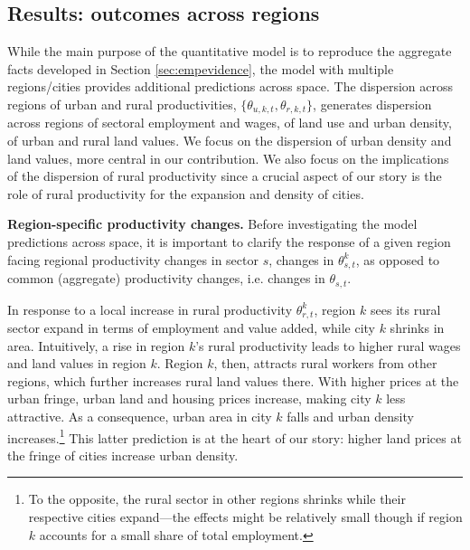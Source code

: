 \documentclass[./20250130-paper.tex]{subfiles}
\begin{document}
\subsection{Results: outcomes across regions}\label{sec:rescross}

While the main purpose of the quantitative model is to reproduce the aggregate facts developed in Section \ref{sec:empevidence}, the model with multiple regions/cities provides additional predictions across  space. The dispersion across regions of urban and rural productivities, $\{\theta_{u,k,t }, \theta_{r,k,t}\}$, generates dispersion across regions of sectoral employment and wages, of land use and urban density, of urban and rural land values. We focus on the dispersion of urban density and land values, more central in our contribution. We also focus on the implications of the dispersion of rural productivity since a crucial aspect of our story is the role of rural productivity for the expansion and density of cities. 

\noindent \textbf{Region-specific productivity changes.} Before investigating the model predictions across space, it is important to clarify the response of a given region facing regional productivity changes in sector $s$, changes in $\theta^k_{s,t}$, as opposed to common (aggregate) productivity changes, i.e. changes in $\theta_{s,t}$.

In response to a local increase in rural productivity $\theta^k_{r,t}$, region $k$ sees its rural sector expand in terms of employment and value added, while city $k$ shrinks in area. Intuitively, a rise in region $k$'s rural productivity leads to higher rural wages and land values in region $k$. Region $k$, then, attracts rural workers from other regions, which further increases rural land values there. With higher prices at the urban fringe, urban land and housing prices increase, making city $k$ less attractive. As a consequence, urban area in city $k$ falls and urban density increases.\footnote{To the opposite, the rural sector in other regions shrinks while their respective cities expand---the effects might be relatively small though if region $k$ accounts for a small share of total employment.} This latter prediction is at the heart of our story: higher land prices at the fringe of cities increase urban density. 
\end{document}
